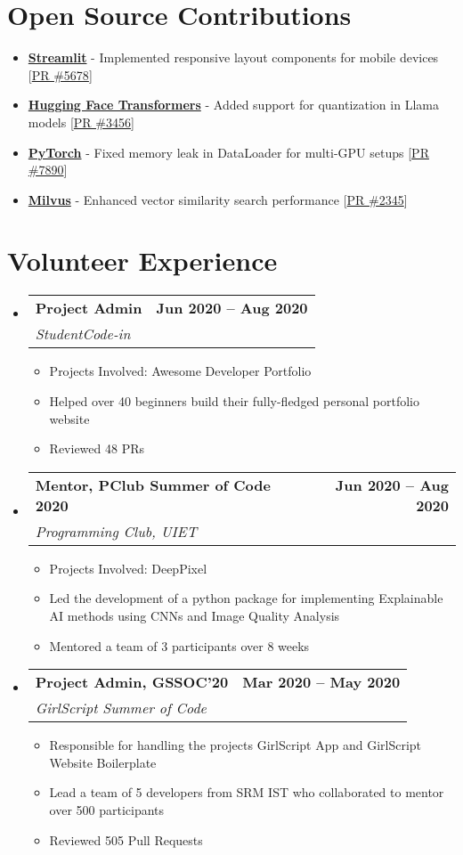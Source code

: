 \documentclass[letterpaper,11pt]{article}
\makeatletter
\newcommand{\resumeItem}[1]{
  \item\small{
    {#1 \vspace{-2pt}}
  }
}
\newcommand{\resumeSubheading}[4]{
  \vspace{-2pt}\item
    \begin{tabular*}{1.0\textwidth}[t]{l@{\extracolsep{\fill}}r}
      \textbf{#1} & \textbf{\small\color{datecolor} #2} \\
      \textit{\small#3} & \textit{\small #4} \\
    \end{tabular*}\vspace{-7pt}
}
\newcommand{\resumeSubHeadingListStart}{\begin{itemize}[leftmargin=0.0in, label={}]}
\newcommand{\resumeSubHeadingListEnd}{\end{itemize}}
\newcommand{\resumeItemListStart}{\begin{itemize}}
\newcommand{\resumeItemListEnd}{\end{itemize}\vspace{-5pt}}
\makeatother
\begin{document}
\section{Open Source Contributions}
\resumeSubHeadingListStart
  \resumeItemListStart
    \resumeItem{\textbf{\href{https://github.com/streamlit/streamlit/pull/5678}{\textcolor{maincolor}{Streamlit}}} - Implemented responsive layout components for mobile devices [\href{https://github.com/streamlit/streamlit/pull/5678}{\textcolor{maincolor}{PR \#5678}}]}
    \resumeItem{\textbf{\href{https://github.com/huggingface/transformers/pull/3456}{\textcolor{maincolor}{Hugging Face Transformers}}} - Added support for quantization in Llama models [\href{https://github.com/huggingface/transformers/pull/3456}{\textcolor{maincolor}{PR \#3456}}]}
    \resumeItem{\textbf{\href{https://github.com/pytorch/pytorch/pull/7890}{\textcolor{maincolor}{PyTorch}}} - Fixed memory leak in DataLoader for multi-GPU setups [\href{https://github.com/pytorch/pytorch/pull/7890}{\textcolor{maincolor}{PR \#7890}}]}
    \resumeItem{\textbf{\href{https://github.com/milvus-io/milvus/pull/2345}{\textcolor{maincolor}{Milvus}}} - Enhanced vector similarity search performance [\href{https://github.com/milvus-io/milvus/pull/2345}{\textcolor{maincolor}{PR \#2345}}]}
  \resumeItemListEnd
\resumeSubHeadingListEnd

\section{Volunteer Experience}
\resumeSubHeadingListStart
\resumeSubheading
  {Project Admin}{Jun 2020 -- Aug 2020}
  {StudentCode-in}{}
  \resumeItemListStart
    \resumeItem{Projects Involved: Awesome Developer Portfolio}
    \resumeItem{Helped over 40 beginners build their fully-fledged personal portfolio website}
    \resumeItem{Reviewed 48 PRs}
  \resumeItemListEnd
\resumeSubheading
  {Mentor, PClub Summer of Code 2020}{Jun 2020 -- Aug 2020}
  {Programming Club, UIET}{}
  \resumeItemListStart
    \resumeItem{Projects Involved: DeepPixel}
    \resumeItem{Led the development of a python package for implementing Explainable AI methods using CNNs and Image Quality Analysis}
    \resumeItem{Mentored a team of 3 participants over 8 weeks}
  \resumeItemListEnd
\resumeSubheading
  {Project Admin, GSSOC'20}{Mar 2020 -- May 2020}
  {GirlScript Summer of Code}{}
  \resumeItemListStart
    \resumeItem{Responsible for handling the projects GirlScript App and GirlScript Website Boilerplate}
    \resumeItem{Lead a team of 5 developers from SRM IST who collaborated to mentor over 500 participants}
    \resumeItem{Reviewed 505 Pull Requests}
  \resumeItemListEnd
\resumeSubHeadingListEnd
\end{document}
